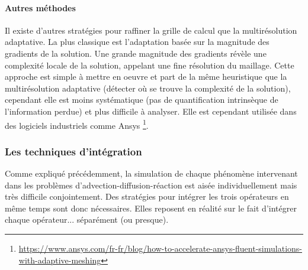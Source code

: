         \paragraph{Autres méthodes}
        Il existe d'autres stratégies pour raffiner la grille de calcul que la multirésolution adaptative.
        La plus classique est l'adaptation basée sur la magnitude des gradients de la solution. Une grande magnitude des gradients révèle une complexité locale de la solution,
        appelant une fine résolution du maillage. Cette approche est simple à mettre en oeuvre et part de la même heuristique 
        que la multirésolution adaptative (détecter où se trouve la complexité de la solution), cependant elle est moins systématique (pas de quantification intrinsèque de l'information perdue) et plus difficile à analyser. 
        Elle est cependant utilisée dans des logiciels industriels comme Ansys 
        \footnote{\href{https://w.ww.ansys.com/fr-fr/blog/how-to-accelerate-ansys-fluent-simulations-with-adaptive-meshing}{https://www.ansys.com/fr-fr/blog/how-to-accelerate-ansys-fluent-simulations-with-adaptive-meshing}}.

    \subsubsection{Les techniques d'intégration}
        Comme expliqué précédemment, la simulation de chaque phénomène intervenant dans les problèmes d'advection-diffusion-réaction est aisée individuellement mais très difficile conjointement.
        Des stratégies pour intégrer les trois opérateurs en même temps sont donc nécessaires. Elles reposent en réalité sur le fait d'intégrer chaque opérateur... séparément (ou presque).


